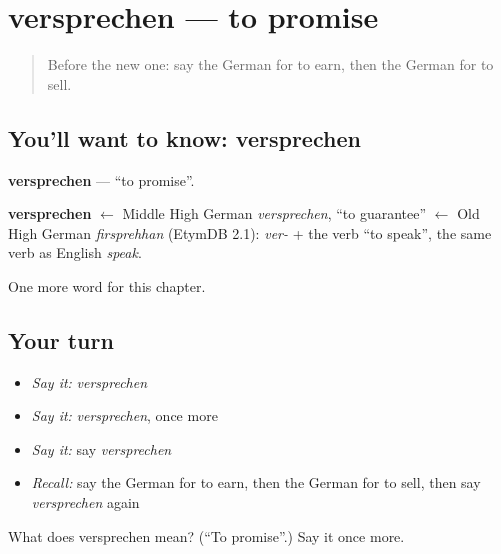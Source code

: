 \section[versprechen]{versprechen — to promise}

\label{lesson:GE-C152-versprechen}



\begin{quote}
Before the new one: say the German for to earn, then the German for to sell.
\end{quote}

\subsection*{You'll want to know: versprechen}
\textbf{versprechen} — \textquotedblleft{}to promise\textquotedblright{}.

\begin{cousinweb}
\textbf{versprechen} $\leftarrow$ Middle High German \emph{versprechen}, \textquotedblleft{}to guarantee\textquotedblright{} $\leftarrow$ Old High German \emph{firsprehhan} (EtymDB 2.1): \emph{ver-} + the verb \textquotedblleft{}to speak\textquotedblright{}, the same verb as English \emph{speak}.
\end{cousinweb}

\begin{grammarlens}[title={What you've built}]
One more word for this chapter.
\end{grammarlens}

\subsection*{Your turn}
\begin{itemize}
\raggedright
  \item \emph{Say it:} \emph{versprechen}
  \item \emph{Say it:} \emph{versprechen}, once more
  \item \emph{Say it:} say \emph{versprechen}
  \item \emph{Recall:} say the German for to earn, then the German for to sell, then say \emph{versprechen} again
\end{itemize}

\begin{tcolorbox}[breakable,colback=teal!4,colframe=teal!35!black,title={Before you move on}]
What does versprechen mean? (\textquotedblleft{}To promise\textquotedblright{}.) Say it once more.
\end{tcolorbox}
